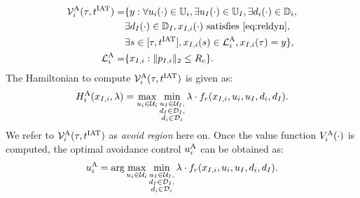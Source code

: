 \begin{equation} \label{eqn:avoidBRS}
\begin{aligned}
\brs^{\text{A}}_{i}(\tau, \iat) = & \{y: \forall \ctrl_i(\cdot) \in \cfset_i, \exists \ctrl_\intr(\cdot) \in \cfset_\intr, \exists \dstb_i(\cdot) \in \dfset_i, \\
& \exists \dstb_\intr(\cdot) \in \dfset_\intr, \state_{\intr, i}(\cdot) \text{ satisfies \eqref{eq:reldyn}},\\
& \exists s \in [\tau, \iat], \state_{\intr, i}(s) \in \targetset^{\text{A}}_{i}, \state_{\intr, i}(\tau) = y\},\\
\targetset^{\text{A}}_{i} = & \{\state_{\intr, i}: \|\pos_{\intr, i}\|_2 \le \rc\}.
\end{aligned}
\end{equation}
The Hamiltonian to compute $\mathcal{V}^{\text{A}}_{i}(\tau, t^\text{IAT})$ is given as:
\begin{equation}
H^{\text{A}}_{i}(x_{I, i}, \lambda) = \max_{u_i \in \mathcal{U}_i} \min_{\substack{u_I \in \mathcal{U}_I, \\ d_I \in \mathcal{D}_I, \\ d_i \in \mathcal{D}_i}} \lambda \cdot f_r(x_{I, i}, u_i, u_I, d_i, d_I).
\end{equation}
We refer to $\mathcal{V}^{\text{A}}_i(\tau, t^\text{IAT})$ as \textit{avoid region} here on. Once the value function $V^{\text{A}}_{i}(\cdot)$ is computed, the optimal avoidance control ${u^{\text{A}}_{i}}$ can be obtained as:
\begin{equation} \label{eqn:optAvoidCtrl}
{\ctrl^{\text{A}}_{i}} = \arg \max_{\ctrl_i \in \cset_i} \min_{\substack{\ctrl_\intr \in \cset_\intr, \\ \dstb_\intr \in \dset_\intr, \\ \dstb_i \in \dset_i}} \costate \cdot f_r(\state_{\intr, i}, \ctrl_i, \ctrl_\intr, \dstb_i, \dstb_\intr).
\end{equation}

